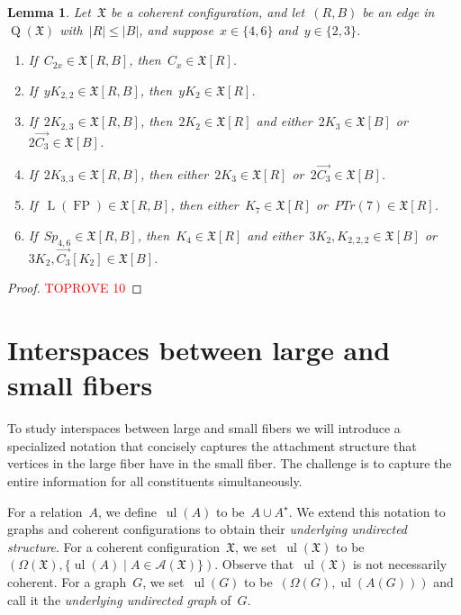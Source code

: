 \documentclass[english,a4paper]{article}
\theoremstyle{plain}
\newtheorem{lemma}      [theorem]{Lemma}
\theoremstyle{definition}
\newcommand{\abs}[1]{| #1 |}
\newcommand{\coherentConfig}{\ensuremath{\mathfrak{X}}}
\newcommand{\interspace}[2]{\ensuremath{\coherentConfig[#1,#2]}}
\newcommand{\inducedCC}[1]{\ensuremath{\coherentConfig[#1]}}
\DeclareMathOperator*{\ul}{ul}
\newcommand{\vertices}{\ensuremath{\Omega}}
\newcommand{\relations}{\ensuremath{\mathcal{A}}}
\newcommand{\arcs}{\ensuremath{A}}
\DeclareMathOperator*{\Quotient}{Q}
\newcommand{\quotientGraph}[1]{\ensuremath{\Quotient(#1)}}
\newcommand{\matchingCC}[1]{\ensuremath{\disjointCliques{#1}{2}}}
\newcommand{\clique}[1]{\ensuremath{K_{#1}}}
\newcommand{\cycle}[1]{\ensuremath{C_{#1}}}
\newcommand{\disjointCliques}[2]{\ensuremath{#1 \clique{#2}}}
\DeclareMathOperator{\fanoPlane}{FP}
\DeclareMathOperator{\LeviGraph}{L}
\newcommand{\leviGraph}[1]{\ensuremath{\LeviGraph\!\left(#1\right)}}
\newcommand{\leviFano}{\leviGraph{\fanoPlane}}
\newcommand{\interspaceFourSix}{\ensuremath{Sp_{4,6}}}
\begin{document}
\begin{lemma}
\label{small-cc:interspace-implies-cc/lem}
    Let~$\coherentConfig$ be a coherent configuration, and let~$(R,B)$ be an edge in~$\quotientGraph{\coherentConfig}$ with~$\abs{R} \leq \abs{B}$, and suppose~$x \in \{4,6\}$ and~$y \in \{2,3\}$.
    \begin{enumerate}[label = (\arabic*)]
        \item
        If~$\cycle{2x} \in \interspace{R}{B}$, then~$\cycle{x} \in \inducedCC{R}$.
        \item
        If~$y\clique{2,2} \in \interspace{R}{B}$, then~$\disjointCliques{y}{2} \in \inducedCC{R}$.
        \item
        If~$\disjointCliques{2}{2,3} \in \interspace{R}{B}$, then~$\matchingCC{2} \in \inducedCC{R}$ and either~$\disjointCliques{2}{3} \in \inducedCC{B}$ or~$2\overrightarrow{C_3} \in \inducedCC{B}$.
        \item
        If~$\disjointCliques{2}{3,3} \in \interspace{R}{B}$, then either~$\disjointCliques{2}{3} \in \inducedCC{R}$ or~$2\overrightarrow{\cycle{3}} \in \inducedCC{B}$.
        \item
        If~$\leviFano \in \interspace{R}{B}$, then either~$\clique{7} \in \inducedCC{R}$ or~$PTr(7) \in \inducedCC{R}$.
        \item
        If~$\interspaceFourSix \in \interspace{R}{B}$, then~$\clique{4} \in \inducedCC{R}$ and either~$\matchingCC{3}, K_{2,2,2} \in \inducedCC{B}$ or~$\matchingCC{3},\overrightarrow{\cycle{3}}[\clique{2}] \in \inducedCC{B}$.
    \end{enumerate}
\end{lemma}
\begin{proof}\textcolor{red}{TOPROVE 10}\end{proof}




     

\section{Interspaces between large and small fibers}
\label{interspace-large-small/sec}

To study interspaces between large and small fibers we will introduce a specialized notation that concisely captures the attachment structure that vertices in the large fiber have in the small fiber.
The challenge is to capture the entire information for all constituents simultaneously.

For a relation~$\arcs$, we define~$\ul(\arcs)$ to be~$\arcs \cup \arcs^\star$.
We extend this notation to graphs and coherent configurations to obtain their \emph{underlying undirected structure}.
For a coherent configuration~$\coherentConfig$, we set~$\ul(\coherentConfig)$ to be~$(\vertices(\coherentConfig), \{\ul(\arcs) \mid \arcs \in \relations(\coherentConfig)\})$.
Observe that~$\ul(\coherentConfig)$ is not necessarily coherent.
For a graph~$G$, we set~$\ul(G)$ to be~$(\vertices(G), \ul(\arcs(G)))$ and call it the \emph{underlying undirected graph} of~$G$.
\end{document}
